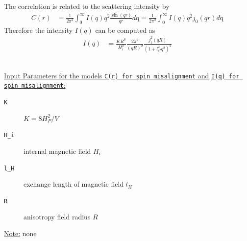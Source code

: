 The correlation is related to the scattering intensity by
\begin{align}
C(r) &= \frac{1}{2\pi^2} \int_0^\infty I(q) q^2
\frac{\sin(qr)}{qr}d\text{q}
 = \frac{1}{2\pi^2} \int_0^\infty I(q) q^2 j_0(qr) d\text{q}
\end{align}
Therefore the intensity $I(q)$ can be
computed as
\begin{align}
I(q) & = \frac{K R^6}{H_i^2}
\frac{2\pi^2}{\left(qR\right)^2}\frac{j_1^2(qR)}{\left(1+l_H^2q^2\right)^2}
\end{align}

\vspace{5mm}

\hspace{1pt}\\
\underline{Input Parameters for the models \texttt{C(r) for spin
misalignment} and} \newline \underline{\texttt{I(q) for spin misalignment}:}\\
\begin{description}
\item[\texttt{K}] $K=8H^2_P/V$
\item[\texttt{H\_i}] internal magnetic field $H_i$
\item[\texttt{l\_H}] exchange length of magnetic field $l_H$
\item[\texttt{R}] anisotropy field radius $R$
\end{description}

\noindent\underline{Note:}
none


